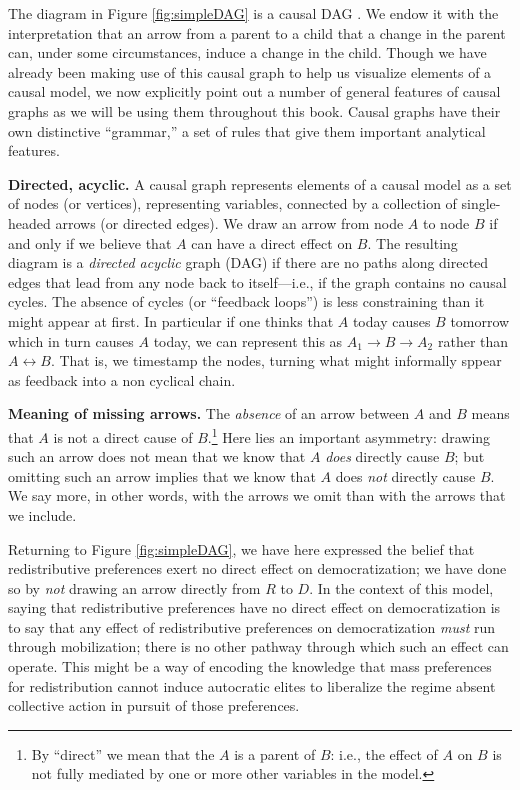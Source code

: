 \documentclass[12pt,]{book}
\let\rmarkdownfootnote\footnote%
\def\footnote{\protect\rmarkdownfootnote}
\begin{document}
The diagram in Figure \ref{fig:simpleDAG} is a causal DAG \citep{hernan2006instruments}. We endow it with the interpretation that an arrow from a parent to a child that a change in the parent can, under some circumstances, induce a change in the child. Though we have already been making use of this causal graph to help us visualize elements of a causal model, we now explicitly point out a number of general features of causal graphs as we will be using them throughout this book. Causal graphs have their own distinctive ``grammar,'' a set of rules that give them important analytical features.

\textbf{Directed, acyclic.} A causal graph represents elements of a causal model as a set of nodes (or vertices), representing variables, connected by a collection of single-headed arrows (or directed edges). We draw an arrow from node \(A\) to node \(B\) if and only if we believe that \(A\) can have a direct effect on \(B\). The resulting diagram is a \emph{directed acyclic} graph (DAG) if there are no paths along directed edges that lead from any node back to itself---i.e., if the graph contains no causal cycles. The absence of cycles (or ``feedback loops'') is less constraining than it might appear at first. In particular if one thinks that \(A\) today causes \(B\) tomorrow which in turn causes \(A\) today, we can represent this as \(A_1 \rightarrow B \rightarrow A_2\) rather than \(A \leftrightarrow B\). That is, we timestamp the nodes, turning what might informally sppear as feedback into a non cyclical chain.

\textbf{Meaning of missing arrows.} The \emph{absence} of an arrow between \(A\) and \(B\) means that \(A\) is not a direct cause of \(B\).\footnote{By ``direct'' we mean that the \(A\) is a parent of \(B\): i.e., the effect of \(A\) on \(B\) is not fully mediated by one or more other variables in the model.} Here lies an important asymmetry: drawing such an arrow does not mean that we know that \(A\) \emph{does} directly cause \(B\); but omitting such an arrow implies that we know that \(A\) does \emph{not} directly cause \(B\). We say more, in other words, with the arrows we omit than with the arrows that we include.

Returning to Figure \ref{fig:simpleDAG}, we have here expressed the belief that redistributive preferences exert no direct effect on democratization; we have done so by \emph{not} drawing an arrow directly from \(R\) to \(D\). In the context of this model, saying that redistributive preferences have no direct effect on democratization is to say that any effect of redistributive preferences on democratization \emph{must} run through mobilization; there is no other pathway through which such an effect can operate. This might be a way of encoding the knowledge that mass preferences for redistribution cannot induce autocratic elites to liberalize the regime absent collective action in pursuit of those preferences.
\end{document}
